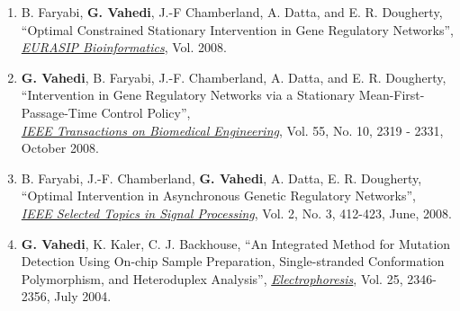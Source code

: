\documentclass[10pt]{article}
\makeatletter
\newlength{\bibhang}
\newlength{\bibsep}
 {\@listi \global\bibsep\itemsep \global\advance\bibsep by\parsep}
\newenvironment{bibsection}%
        {\begin{enumerate}{}{%
       \setlength{\leftmargin}{\bibhang}%
       \setlength{\itemindent}{-\leftmargin}%
       \setlength{\itemsep}{\bibsep}%
       \setlength{\parsep}{\z@}%
        \setlength{\partopsep}{0pt}%
        \setlength{\topsep}{0pt}}}
        {\end{enumerate}\vspace{-0.6\baselineskip}}
\makeatother
\begin{document}
\begin{bibsection}
\item B. Faryabi, {\bf{G. Vahedi}}, J.-F Chamberland, A. Datta, and E. R. Dougherty, ``Optimal Constrained Stationary Intervention in Gene Regulatory Networks'',\\ \underline {\emph{EURASIP Bioinformatics}}, Vol. 2008.

\item {\bf{G. Vahedi}}, B. Faryabi, J.-F. Chamberland, A. Datta, and E. R. Dougherty, ``Intervention in Gene Regulatory Networks via a Stationary Mean-First-Passage-Time Control Policy'', \\ \underline{\emph{IEEE Transactions on Biomedical Engineering}}, Vol. 55, No. 10, 2319 - 2331, October 2008.

\item B. Faryabi, J.-F. Chamberland, {\bf{G. Vahedi}}, A. Datta, E. R. Dougherty, ``Optimal Intervention in Asynchronous Genetic Regulatory Networks'', \\\underline {\emph{IEEE Selected Topics in Signal Processing}}, Vol. 2, No. 3, 412-423, June, 2008.

\item {\bf{G. Vahedi}}, K. Kaler, C. J. Backhouse, ``An Integrated Method for Mutation Detection Using On-chip Sample Preparation, Single-stranded Conformation Polymorphism, and Heteroduplex Analysis'', \underline {\emph{Electrophoresis}}, Vol. 25, 2346-2356, July 2004.
\end{bibsection}
\end{document}
